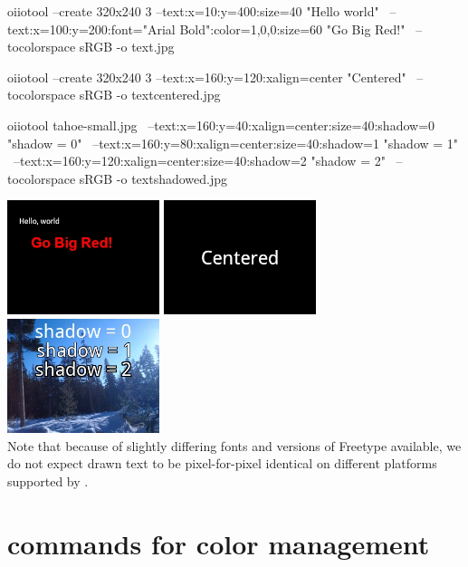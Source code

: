 \begin{smallcode}
    oiiotool --create 320x240 3 --text:x=10:y=400:size=40 "Hello world" \
        --text:x=100:y=200:font="Arial Bold":color=1,0,0:size=60 "Go Big Red!" \
        --tocolorspace sRGB -o text.jpg

    oiiotool --create 320x240 3 --text:x=160:y=120:xalign=center "Centered" \
        --tocolorspace sRGB -o textcentered.jpg

    oiiotool tahoe-small.jpg \
            --text:x=160:y=40:xalign=center:size=40:shadow=0 "shadow = 0" \
            --text:x=160:y=80:xalign=center:size=40:shadow=1 "shadow = 1" \
            --text:x=160:y=120:xalign=center:size=40:shadow=2 "shadow = 2" \
            --tocolorspace sRGB -o textshadowed.jpg
\end{smallcode}
\includegraphics[width=1.75in]{figures/text.jpg}
\includegraphics[width=1.75in]{figures/textcentered.jpg}
\includegraphics[width=1.75in]{figures/textshadowed.jpg} \\

\noindent Note that because of slightly differing fonts and versions of
Freetype available, we do not expect drawn text to be pixel-for-pixel 
identical on different platforms supported by \product.
\apiend



\section{\oiiotool commands for color management}

